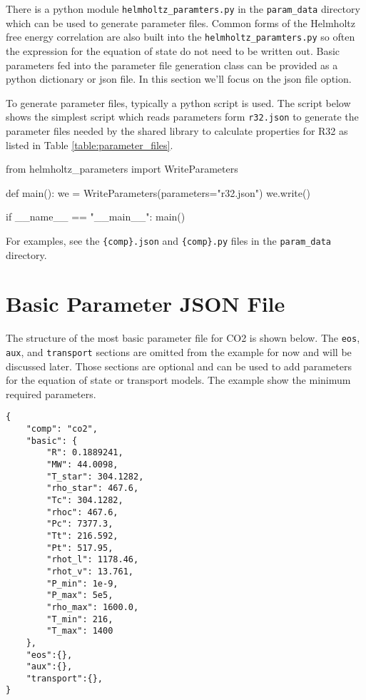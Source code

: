 \documentclass[oneside]{book}
\begin{document}
There is a python module \texttt{helmholtz\_paramters.py} in the \texttt{param\_data} directory which can be used to generate parameter files.  Common forms of the Helmholtz free energy correlation are also built into the \texttt{helmholtz\_paramters.py} so often the expression for the equation of state do not need to be written out.  Basic parameters fed into the parameter file generation class can be provided as a python dictionary or json file.  In this section we'll focus on the json file option.

To generate parameter files, typically a python script is used.  The script below shows the simplest script which reads parameters form \texttt{r32.json} to generate the parameter files needed by the shared library to calculate properties for R32 as listed in Table \ref{table:parameter_files}.

\begin{python}
from helmholtz_parameters import WriteParameters

def main():
    we = WriteParameters(parameters="r32.json")
    we.write()

if __name__ == "__main__":
    main()
\end{python}

For examples, see the \texttt{\{comp\}.json} and \texttt{\{comp\}.py} files in the \texttt{param\_data} directory. 

\section{Basic Parameter JSON File}

The structure of the most basic parameter file for CO2 is shown below.  The \texttt{eos}, \texttt{aux}, and \texttt{transport} sections are omitted from the example for now and will be discussed later.  Those sections are optional and can be used to add parameters for the equation of state or transport models.  The example show the minimum required parameters.

\begin{verbatim}
{
    "comp": "co2",
    "basic": {
        "R": 0.1889241,
        "MW": 44.0098,
        "T_star": 304.1282,
        "rho_star": 467.6,
        "Tc": 304.1282,
        "rhoc": 467.6,
        "Pc": 7377.3,
        "Tt": 216.592,
        "Pt": 517.95,
        "rhot_l": 1178.46,
        "rhot_v": 13.761,
        "P_min": 1e-9,
        "P_max": 5e5,
        "rho_max": 1600.0,
        "T_min": 216,
        "T_max": 1400
    },
    "eos":{},
    "aux":{},
    "transport":{},
}
\end{verbatim}
\end{document}
